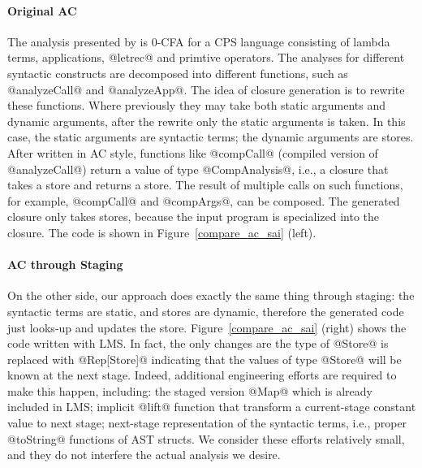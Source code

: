 \paragraph{Original AC} 

The analysis presented by \citeauthor{Boucher:1996:ACN:647473.727587} is 0-CFA
for a CPS language consisting of lambda terms, applications, @letrec@ and
primtive operators. The analyses for different syntactic constructs are
decomposed into different functions, such as @analyzeCall@ and @analyzeApp@. The
idea of closure generation is to rewrite these functions. Where previously they
may take both static arguments and dynamic arguments, after the rewrite only the
static arguments is taken. In this case, the static arguments are syntactic
terms; the dynamic arguments are stores. After written in AC style, functions
like @compCall@ (compiled version of @analyzeCall@) return a value of type
@CompAnalysis@, i.e., a closure that takes a store and returns a store. The
result of multiple calls on such functions, for example, @compCall@ and
@compArgs@, can be composed. The generated closure only takes stores, because
the input program is specialized into the closure. The code is shown in
Figure~\ref{compare_ac_sai} (left).

\paragraph{AC through Staging}

On the other side, our approach does exactly the same thing through staging: the
syntactic terms are static, and stores are dynamic, therefore the generated code
just looks-up and updates the store. Figure~\ref{compare_ac_sai} (right) shows
the code written with LMS. In fact, the only changes are the type of @Store@ is
replaced with @Rep[Store]@ indicating that the values of type @Store@ will be
known at the next stage. Indeed, additional engineering efforts are required to
make this happen, including: the staged version @Map@ which is already included
in LMS; implicit @lift@ function that transform a current-stage constant value
to next stage; next-stage representation of the syntactic terms, i.e., proper
@toString@ functions of AST structs. We consider these efforts relatively small,
and they do not interfere the actual analysis we desire.


